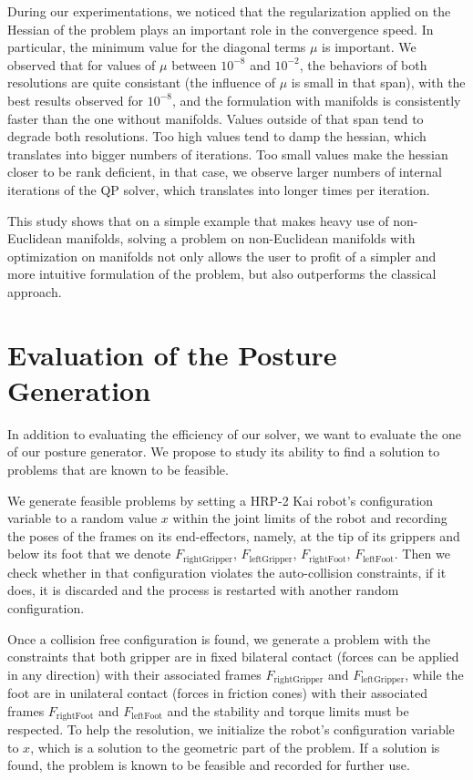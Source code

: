 During our experimentations, we noticed that the regularization applied on the Hessian of the problem plays an important role in the convergence speed.
In particular, the minimum value for the diagonal terms $\mu$ is important.
We observed that for values of $\mu$ between $10^{-8}$ and $10^{-2}$, the behaviors of both resolutions are quite consistant (the influence of $\mu$ is small in that span), with the best results observed for $10^{-8}$, and the formulation with manifolds is consistently faster than the one without manifolds.
Values outside of that span tend to degrade both resolutions.
Too high values tend to damp the hessian, which translates into bigger numbers of iterations.
Too small values make the hessian closer to be rank deficient, in that case, we observe larger numbers of internal iterations of the QP solver, which translates into longer times per iteration.

This study shows that on a simple example that makes heavy use of non-Euclidean manifolds, solving a problem on non-Euclidean manifolds with optimization on manifolds not only allows the user to profit of a simpler and more intuitive formulation of the problem, but also outperforms the classical approach.


\section{Evaluation of the Posture Generation}
\label{sec:evaluation_of_the_posture_generation}

In addition to evaluating the efficiency of our solver, we want to evaluate the one of our posture generator.
We propose to study its ability to find a solution to problems that are known to be feasible.

We generate feasible problems by setting a HRP-2 Kai robot's configuration variable to a random value $x$ within the joint limits of the robot and recording the poses of the frames  on its end-effectors, namely, at the tip of its grippers and below its foot that we denote $F_\text{rightGripper}$, $F_\text{leftGripper}$, $F_\text{rightFoot}$, $F_\text{leftFoot}$.
Then we check whether in that configuration violates the auto-collision constraints, if it does, it is discarded and the process is restarted with another random configuration.

Once a collision free configuration is found, we generate a problem with the constraints that both gripper are in fixed bilateral contact (forces can be applied in any direction) with their associated frames $F_\text{rightGripper}$ and $F_\text{leftGripper}$, while the foot are in unilateral contact (forces in friction cones) with their associated frames $F_\text{rightFoot}$ and $F_\text{leftFoot}$ and the stability and torque limits must be respected.
To help the resolution, we initialize the robot's configuration variable to $x$, which is a solution to the geometric part of the problem.
If a solution is found, the problem is known to be feasible and recorded for further use.


